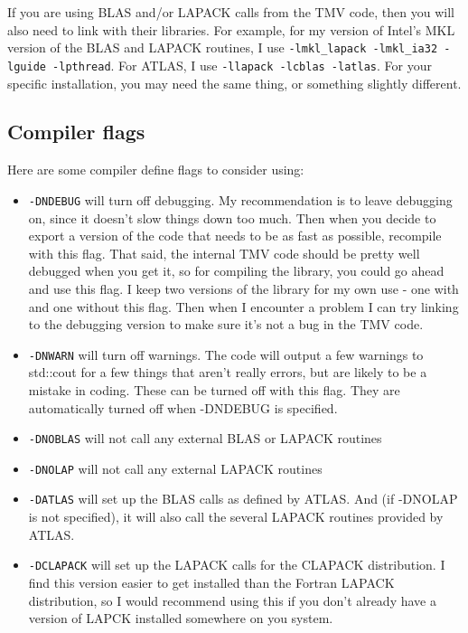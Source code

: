 \documentclass[twoside,letterpaper,11pt]{article}
\renewcommand{\tt}[1]{{\texttt {#1}}}
\begin{document}
\begin{enumerate}
If you are using BLAS and/or LAPACK calls from the TMV code,
then you will also need to 
link with their libraries.  
For example, for my version of Intel's MKL version of the BLAS and LAPACK
routines, I use 
\tt{-lmkl\_lapack -lmkl\_ia32 -lguide -lpthread}.  
For ATLAS,
I use \tt{-llapack -lcblas -latlas}.  For your specific installation, you may need 
the same thing, or something slightly different.

\end{enumerate}

\subsection{Compiler flags}

Here are some compiler define flags to consider using:
\begin{itemize}
\item
\tt{-DNDEBUG} will turn off debugging.  My recommendation is to leave debugging
on, since it doesn't slow things down too much.  Then when you decide to 
export a version of the code that needs to be as fast as possible, recompile
with this flag.  That said, the internal TMV code should be pretty well debugged
when you get it, so for compiling the library, you could go ahead and use this flag.
I keep two versions of the library for my own use - one with and one without 
this flag.  Then when I encounter a problem I can try linking to the debugging 
version to make sure it's not a bug in the TMV code.
\item
\tt{-DNWARN} will turn off warnings.  The code will output a few warnings to 
std::cout for a few things that aren't really errors, but are likely to be a
mistake in coding.  These can be turned off with this flag.
They are automatically turned off when -DNDEBUG is specified. 
\item
\tt{-DNOBLAS} will not call any external BLAS or LAPACK routines
\item
\tt{-DNOLAP} will not call any external LAPACK routines
\item
\tt{-DATLAS} will set up the BLAS calls as defined by ATLAS.  And (if -DNOLAP
is not specified), it will also call the several LAPACK routines
provided by ATLAS.
\item
\tt{-DCLAPACK} will set up the LAPACK calls for the CLAPACK distribution.  I 
find this version easier to get installed than the Fortran LAPACK distribution,
so I would recommend using this if you don't already have a version of LAPCK
installed somewhere on you system.  

\end{itemize}
\end{document}
